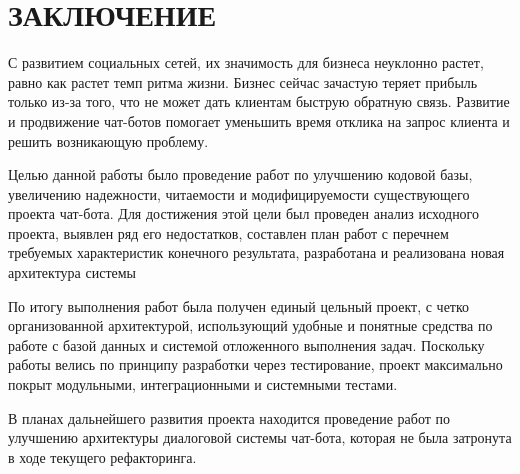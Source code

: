 \section*{ЗАКЛЮЧЕНИЕ}
    С развитием социальных сетей, их значимость для бизнеса неуклонно растет,
    равно как растет темп ритма жизни. Бизнес сейчас зачастую теряет прибыль
    только из-за того, что не может дать клиентам быструю обратную связь.
    Развитие и продвижение чат-ботов помогает уменьшить время отклика на запрос
    клиента и решить возникающую проблему.

    Целью данной работы было проведение работ по улучшению кодовой базы,
    увеличению надежности, читаемости и модифицируемости существующего проекта чат-бота.
    Для достижения этой цели был проведен анализ исходного проекта, выявлен ряд
    его недостатков, составлен план работ с перечнем требуемых характеристик конечного
    результата, разработана и реализована новая архитектура системы

    По итогу выполнения работ была получен единый цельный проект, с четко
    организованной архитектурой,
    использующий удобные и понятные средства по работе с базой данных
    и системой отложенного выполнения задач.
    Поскольку работы велись по принципу разработки через тестирование,
    проект максимально покрыт
    модульными, интеграционными и системными тестами.

    В планах дальнейшего развития проекта находится проведение работ по улучшению
    архитектуры диалоговой системы чат-бота, которая не была затронута в ходе
    текущего рефакторинга.
